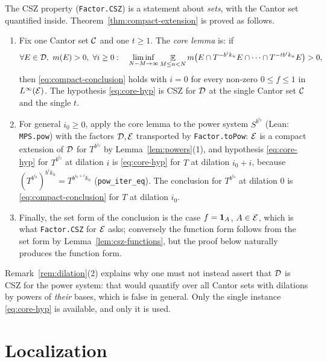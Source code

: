 \begin{remark}
  \label{rem:compact-organization}
  The CSZ property (\texttt{Factor.CSZ}) is a statement about \emph{sets}, with the Cantor set
  quantified inside.  Theorem~\ref{thm:compact-extension} is proved as follows.
  \begin{enumerate}
    \item Fix one Cantor set $\mathcal{C}$ and one $t \geq 1$.  The \emph{core lemma} is: if
      \begin{equation}
        \label{eq:core-hyp}
        \forall E \in \mathcal{D},\ m(E) > 0,\ \forall i \geq 0 : \quad
        \liminf_{N-M \to \infty} \mathop{\mathbb{E}}_{M \leq n < N} m\bigl( E \cap T^{-b^ik_n}E \cap \cdots \cap T^{-tb^ik_n}E \bigr) > 0 ,
      \end{equation}
      then \eqref{eq:compact-conclusion} holds with $i = 0$ for every non-zero
      $0 \leq f \leq 1$ in $L^{\infty}(\mathcal{E})$.  The hypothesis \eqref{eq:core-hyp} is CSZ for
      $\mathcal{D}$ at the single Cantor set $\mathcal{C}$ and the single $t$.
    \item For general $i_0 \geq 0$, apply the core lemma to the power system $S^{b^{i_0}}$ (Lean:
      \texttt{MPS.pow}) with the factors $\mathcal{D}, \mathcal{E}$ transported by \texttt{Factor.toPow}:
      $\mathcal{E}$ is a compact extension of $\mathcal{D}$ for $T^{b^{i_0}}$ by Lemma~\ref{lem:powers}(1),
      and hypothesis \eqref{eq:core-hyp} for $T^{b^{i_0}}$ at dilation $i$ is
      \eqref{eq:core-hyp} for $T$ at dilation $i_0 + i$, because
      $(T^{b^{i_0}})^{b^ik_n} = T^{b^{i_0+i}k_n}$ (\texttt{pow\_iter\_eq}).  The conclusion
      for $T^{b^{i_0}}$ at dilation $0$ is \eqref{eq:compact-conclusion} for $T$ at dilation
      $i_0$.
    \item Finally, the set form of the conclusion is the case $f = \mathbf{1}_A$, $A \in \mathcal{E}$,
      which is what \texttt{Factor.CSZ} for $\mathcal{E}$ asks; conversely the function form follows
      from the set form by Lemma~\ref{lem:csz-functions}, but the proof below naturally produces
      the function form.
  \end{enumerate}
  Remark~\ref{rem:dilation}(2) explains why one must not instead assert that $\mathcal{D}$ is CSZ for
  the power system: that would quantify over all Cantor sets with dilations by powers of
  \emph{their} bases, which is false in general.  Only the single instance \eqref{eq:core-hyp}
  is available, and only it is used.
\end{remark}

\section{Localization}

